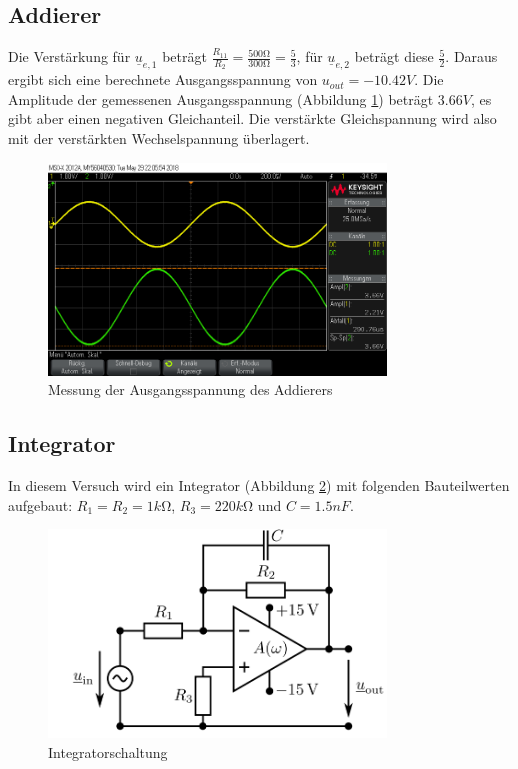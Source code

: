 \documentclass[a4paper]{article}
\begin{document}
\subsection{Addierer}

Die Verstärkung für $\underline{u}_{e,1}$ beträgt $\frac{R_{11}}{R_2}=\frac{500\si{\ohm}}{300\si{\ohm}}=\frac{5}{3}$, für $\underline{u}_{e,2}$ beträgt diese $\frac{5}{2}$. Daraus ergibt sich eine berechnete Ausgangsspannung von $u_{out}=-10.42\si{V}$.
Die Amplitude der gemessenen Ausgangsspannung (Abbildung \ref{fig:versuch3-addierer-screenshot}) beträgt $3.66\si{V}$, es gibt aber einen negativen Gleichanteil. Die verstärkte Gleichspannung wird also mit der verstärkten Wechselspannung überlagert.

\begin{figure}[H]
    \centering
    \includegraphics[width=0.8\textwidth]{versuch3/scope_18.png}
    \caption{Messung der Ausgangsspannung des Addierers}
    \label{fig:versuch3-addierer-screenshot}
\end{figure}

\subsection{Integrator}

In diesem Versuch wird ein Integrator (Abbildung \ref{fig:versuch4-aufbau-integrator}) mit folgenden Bauteilwerten aufgebaut: $R_1=R_2=1\si{k\ohm}$, $R_3=220\si{k\ohm}$ und $C=1.5\si{nF}$.
\begin{figure}[H]
    \centering
    \includegraphics[width=0.8\textwidth]{versuch4/aufbau-integrator.png}
    \caption{Integratorschaltung}
    \label{fig:versuch4-aufbau-integrator}
\end{figure}
\end{document}
